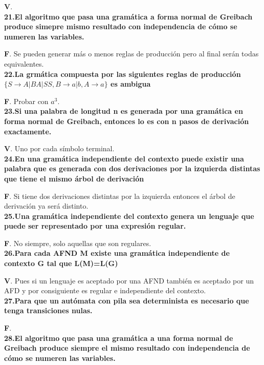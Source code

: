 \documentclass[a4paper,11pt]{article}
\begin{document}
\textbf{V}. \\

\textbf{21.El algoritmo que pasa una gramática a forma normal de Greibach produce simepre mismo resultado con independencia de cómo se numeren las variables.}

\textbf{F}. Se pueden generar más o menos reglas de producción pero al final serán todas equivalentes. \\

\textbf{22.La grmática compuesta por las siguientes reglas de producción $\{S\rightarrow A|BA|SS, B\rightarrow a|b, A \rightarrow a\}$ es ambigua}

\textbf{F}. Probar con $a^3$. \\

\textbf{23.Si una palabra de longitud n es generada por una gramática en forma normal de Greibach, entonces lo es con n pasos de derivación exactamente.}

\textbf{V}. Uno por cada símbolo terminal. \\

\textbf{24.En una gramática independiente del contexto puede existir una palabra que es generada con dos derivaciones por la izquierda distintas que tiene el mismo árbol de derivación}

\textbf{F}. Si tiene dos derivaciones distintas por la izquierda entonces el árbol de derivación ya será distinto. \\

\textbf{25.Una gramática independiente del contexto genera un lenguaje que puede ser representado por una expresión regular.}

\textbf{F}. No siempre, solo aquellas que son regulares. \\

\textbf{26.Para cada AFND M existe una gramática independiente de contexto G tal que L(M)=L(G)}

\textbf{V}. Pues si un lenguaje es aceptado por una AFND también es aceptado por un AFD y por consiguiente es regular e independiente del contexto.\\

\textbf{27.Para que un autómata con pila sea determinista es necesario que tenga transiciones nulas.}

\textbf{F}. \\

\textbf{28.El algoritmo que pasa una gramática a una forma normal de Greibach produce siempre el mismo resultado con independencia de cómo se numeren las variables.}
\end{document}
